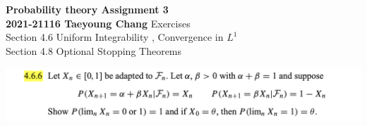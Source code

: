 \documentclass[12pt, A4]{article}
\begin{document}
\begin{titlepage}
	\begin{center}
		\vspace*{5cm}
		\textbf{\Large Probability theory \MakeUppercase{} Assignment 3}
		\\
		\vspace{1.5cm}
		\textbf{2021-21116 Taeyoung Chang}
		\vfill
		Exercises \\ Section 4.6 Uniform Integrability , Convergence in $L^1$ \\ Section 4.8 Optional Stopping Theorems
	
		\vspace*{3cm}
		\thispagestyle{empty}
	\end{center}
\end{titlepage}

\includegraphics[width=17cm]{Exer4.6.6.png}
\end{document}
